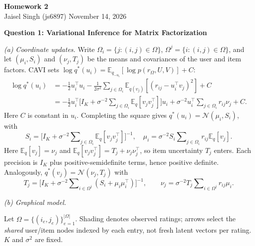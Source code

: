\documentclass[12pt]{article}
\newcommand{\E}{\mathbb{E}}
\newcommand{\N}{\mathcal{N}}
\begin{document}
\begin{flushleft}
\textbf{Homework 2}\\
Jaisel Singh (js6897) \hfill November 14, 2026
\end{flushleft}

\textbf{Question 1: Variational Inference for Matrix Factorization}

\textit{(a) Coordinate updates.}
Write $\Omega_i=\{j:(i,j)\in\Omega\}$, $\Omega^j=\{i:(i,j)\in\Omega\}$,
and let $(\mu_i,S_i)$ and $(\nu_j,T_j)$ be the means and covariances of the
user and item factors. CAVI sets $\log q^*(u_i)=\E_{q_{-u_i}}[\log p(r_\Omega,U,V)]+C$:
\[
\begin{aligned}
\log q^*(u_i)
&=-\tfrac12u_i^\top u_i
  -\frac{1}{2\sigma^2}\sum\nolimits_{j\in\Omega_i}\E_{q(v_j)}[(r_{ij}-u_i^\top v_j)^2]+C\\
&=-\tfrac12u_i^\top\!\bigl[I_K+\sigma^{-2}\sum\nolimits_{j\in\Omega_i}\E_q[v_jv_j^\top]\bigr]u_i
  +\sigma^{-2}u_i^\top\sum\nolimits_{j\in\Omega_i}r_{ij}\nu_j+C.
\end{aligned}
\]
Here $C$ is constant in $u_i$. Completing the square gives $q^*(u_i)=\N(\mu_i,S_i)$, with
\[
\boxed{\quad
S_i=\bigl[I_K+\sigma^{-2}\sum\nolimits_{j\in\Omega_i}\E_q[v_jv_j^\top]\bigr]^{-1},\quad
\mu_i=\sigma^{-2}S_i\sum\nolimits_{j\in\Omega_i}r_{ij}\E_q[v_j].\quad}
\]
Here $\E_q[v_j]=\nu_j$ and $\E_q[v_jv_j^\top]=T_j+\nu_j\nu_j^\top$, so item uncertainty
$T_j$ enters. Each precision is $I_K$ plus positive-semidefinite terms, hence positive
definite. Analogously, $q^*(v_j)=\N(\nu_j,T_j)$ with
\[
T_j=\bigl[I_K+\sigma^{-2}\sum\nolimits_{i\in\Omega^j}(S_i+\mu_i\mu_i^\top)\bigr]^{-1},\qquad
\nu_j=\sigma^{-2}T_j\sum\nolimits_{i\in\Omega^j}r_{ij}\mu_i.
\]

\textit{(b) Graphical model.}
\begin{center}
\begin{minipage}{0.49\linewidth}
\centering
{}
\end{minipage}\hfill
\begin{minipage}{0.49\linewidth}
Let $\Omega=\{(i_e,j_e)\}_{e=1}^{|\Omega|}$. Shading denotes observed ratings;
arrows select the \emph{shared} user/item nodes indexed by each entry, not fresh
latent vectors per rating. $K$ and $\sigma^2$ are fixed.
\end{minipage}
\end{center}
\end{document}
